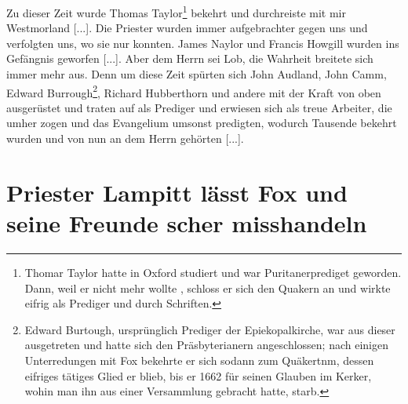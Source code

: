 Zu dieser Zeit wurde Thomas Taylor\footnote{Thomar Taylor 
hatte in Oxford studiert und war Puritanerprediget
geworden. Dann, weil er nicht mehr wollte 
, schloss er sich den Quakern an 
und wirkte eifrig als Prediger und durch Schriften.} bekehrt und 
durchreiste mit mir Westmorland [...]. 
Die Priester wurden immer
aufgebrachter gegen uns und verfolgten uns, wo sie nur konnten.
James Naylor und Francis 
Howgill wurden ins Gefängnis 
geworfen [...]. Aber dem Herrn sei Lob, die Wahrheit breitete sich
immer mehr aus. Denn um diese Zeit spürten sich 
John Audland, John 
Camm, Edward 
Burrough\footnote{Edward Burtough, ursprünglich 
Prediger der Epiekopalkirche, war
aus dieser ausgetreten und hatte sich den Präsbyterianern 
angeschlossen; nach einigen Unterredungen mit Fox bekehrte 
er sich sodann zum Quäkertnm, dessen eifriges tätiges Glied er 
blieb, bis er 1662 für seinen Glauben im Kerker, wohin
man ihn aus einer Versammlung gebracht hatte, starb.}, 
Richard Hubberthorn
und andere mit der Kraft von oben ausgerüstet und traten auf
als Prediger und erwiesen sich als treue Arbeiter, die umher
zogen und das Evangelium umsonst predigten, wodurch Tausende
bekehrt wurden und von nun an dem Herrn gehörten [...].

\section{Priester Lampitt lässt Fox und seine Freunde scher misshandeln}

